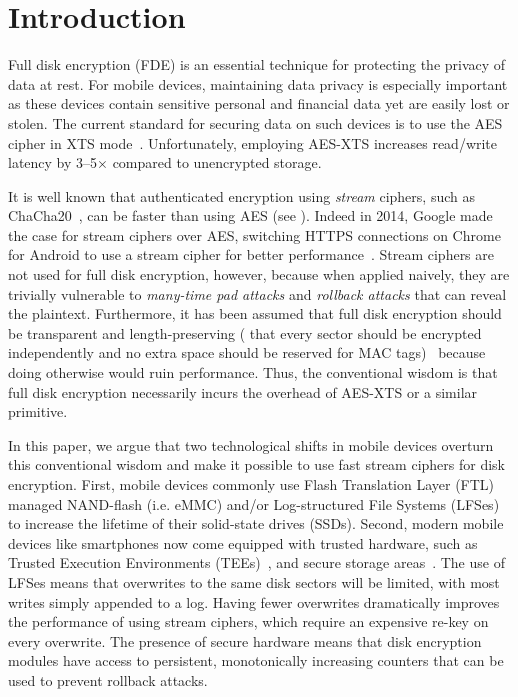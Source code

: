 \chapter{Introduction} \label{sec:introduction}

Full disk encryption (FDE) is an essential technique for protecting the
privacy of data at rest. For mobile devices, maintaining data privacy
is especially important as these devices contain sensitive personal
and financial data yet are easily lost or stolen.  The current
standard for securing data on such devices is to use the AES cipher in
XTS mode~\cite{XTS, NISTXTS}.  Unfortunately, employing AES-XTS increases
read/write latency by 3--5$\times$ compared to unencrypted storage.

It is well known that authenticated encryption using \emph{stream} ciphers, such as
ChaCha20~\cite{ChaCha20}, can be faster than using AES (see ). Indeed
in 2014, Google made the case for stream ciphers over AES, switching HTTPS connections on
Chrome for Android to use a stream cipher for better performance~\cite{google-blog}.
Stream ciphers are not used for full disk encryption, however, because when applied
naively, they are trivially vulnerable to \emph{many-time pad attacks} and \emph{rollback
attacks} that can reveal the plaintext. Furthermore, it has been assumed that full disk
encryption should be transparent and length-preserving (\ie{} that every sector should be
encrypted independently and no extra space should be reserved for MAC tags)~\cite{XTS}
because doing otherwise would ruin performance. Thus, the conventional wisdom is that
full disk encryption necessarily incurs the overhead of AES-XTS or a similar primitive.

In this paper, we argue that two technological shifts in mobile devices overturn this
conventional wisdom and make it possible to use fast stream ciphers for disk encryption.
First, mobile devices commonly use Flash Translation Layer (FTL) managed NAND-flash (i.e. eMMC) and/or Log-structured File Systems
(LFSes)~\cite{LFS,F2FS,NILFS} to increase the lifetime of their solid-state drives
(SSDs). Second, modern mobile devices like smartphones now come equipped with trusted
hardware, such as Trusted Execution Environments (TEEs)~\cite{TEE,TrustZone}, and secure
storage areas~\cite{eMMC-standard}. The use of LFSes means that overwrites to the same disk sectors
will be limited, with most writes simply appended to a log. Having fewer overwrites
dramatically improves the performance of using stream ciphers, which require an expensive
re-key on every overwrite. The presence of secure hardware means that disk encryption
modules have access to persistent, monotonically increasing counters that can be used to
prevent rollback attacks.

